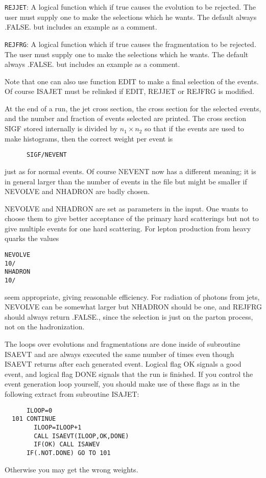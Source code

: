        \verb|REJJET|: A logical function which if true causes the
evolution to be rejected. The user must supply one to make the
selections which he wants. The default always .FALSE. but includes an
example as a comment.

      \verb|REJFRG|: A logical function which if true causes the
fragmentation to be rejected. The user must supply one to make the
selections which he wants. The default always .FALSE. but includes an
example as a comment.

\noindent Note that one can also use function EDIT to make a final
selection of the events. Of course ISAJET must be relinked if EDIT,
REJJET or REJFRG is modified.

      At the end of a run, the jet cross section, the cross section for
the selected events, and the number and fraction of events selected are
printed. The cross section SIGF stored internally is divided by $n_1
\times n_2$ so that if the events are used to make histograms, then
the correct weight per event is
\begin{verbatim}
      SIGF/NEVENT
\end{verbatim}
just as for normal events. Of course NEVENT now has a different meaning;
it is in general larger than the number of events in the file but might
be smaller if NEVOLVE and NHADRON are badly chosen.

      NEVOLVE and NHADRON are set as parameters in the input. One wants
to choose them to give better acceptance of the primary hard scatterings
but not to give multiple events for one hard scattering. For lepton 
production from heavy quarks the values
\begin{verbatim}
NEVOLVE
10/
NHADRON
10/
\end{verbatim}
seem appropriate, giving reasonable efficiency. For radiation of photons
from jets, NEVOLVE can be somewhat larger but NHADRON should be one, and
REJFRG should always return .FALSE., since the selection is just on the
parton process, not on the hadronization.

      The loops over evolutions and fragmentations are done inside of
subroutine ISAEVT and are always executed the same number of times even
though ISAEVT returns after each generated event. Logical flag OK
signals a good event, and logical flag DONE signals that the run is
finished. If you control the event generation loop yourself, you should
make use of these flags as in the following extract from subroutine
ISAJET:
\begin{verbatim}
      ILOOP=0
  101 CONTINUE
        ILOOP=ILOOP+1
        CALL ISAEVT(ILOOP,OK,DONE)
        IF(OK) CALL ISAWEV
      IF(.NOT.DONE) GO TO 101
\end{verbatim}
Otherwise you may get the wrong weights.

